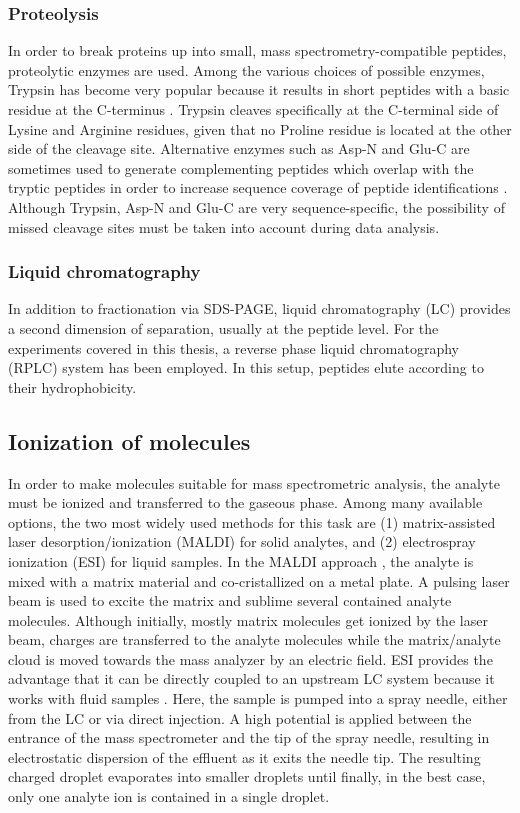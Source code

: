 \subsubsection{Proteolysis}

In order to break proteins up into small, mass spectrometry-compatible peptides, 
proteolytic enzymes are used.
Among the various choices of possible enzymes, Trypsin has become very popular
because it results in short peptides with a basic residue at the C-terminus
\citep{Olsen2004}.
Trypsin cleaves specifically at the C-terminal side of Lysine and Arginine 
residues, given that no Proline residue is located at the other side of the 
cleavage site.
Alternative enzymes such as Asp-N and Glu-C are sometimes used to generate
complementing peptides which overlap with the tryptic peptides in order to 
increase sequence coverage of peptide identifications \citep{Steen2004}.
Although Trypsin, Asp-N and Glu-C are very sequence-specific, the possibility 
of missed cleavage sites must be taken into account during data analysis.

\subsubsection{Liquid chromatography}

In addition to fractionation via SDS-PAGE, liquid chromatography (LC) provides 
a second dimension of separation, usually at the peptide level.
For the experiments covered in this thesis, a reverse phase liquid 
chromatography (RPLC) system has been employed.
In this setup, peptides elute according to their hydrophobicity.

\subsection{Ionization of molecules}

In order to make molecules suitable for mass spectrometric analysis, 
the analyte must be ionized and transferred to the gaseous phase.
Among many available options, the two most widely used methods for this 
task are (1) matrix-assisted laser desorption/ionization (MALDI) for solid 
analytes, and (2) electrospray ionization (ESI) for liquid samples.
In the MALDI approach \citep{Karas1988}, the analyte is mixed with a 
matrix material and co-cristallized on a metal plate. 
A pulsing laser beam is used to excite the matrix and sublime several 
contained analyte molecules. 
Although initially, mostly matrix molecules get ionized by the laser
beam, charges are transferred to the analyte molecules while the
matrix/analyte cloud is moved towards the mass analyzer by an
electric field.
ESI provides the advantage that it can be directly coupled to an
upstream LC system because it works with fluid samples \citep{Fenn1989}.
Here, the sample is pumped into a spray needle, either from the LC or via
direct injection. 
A high potential is applied between the entrance of the mass spectrometer and
the tip of the spray needle, resulting in electrostatic dispersion of the
effluent as it exits the needle tip.
The resulting charged droplet evaporates into smaller droplets until finally,
in the best case, only one analyte ion is contained in a single droplet.

